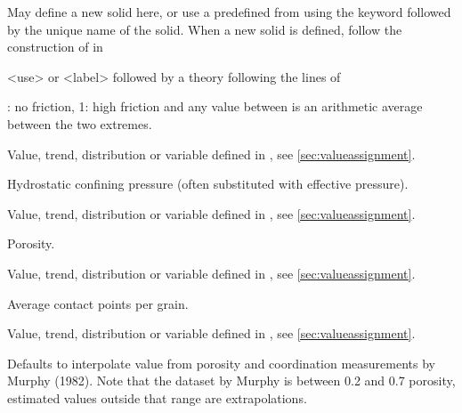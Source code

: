 {
 \slist
   \item \Description May define a new solid here, or use a predefined  from  using the keyword  followed by the unique name of the solid. When a new solid is defined, follow the construction of  in 
   \item \Argument <use> or <label> followed by a theory following the lines of 
   \item \Default
 \elist

 \slist
   \item {}: no friction, 1: high friction and any value between is an arithmetic average between the two extremes.
   \item \Argument Value, trend, distribution or variable defined in , see \autoref{sec:valueassignment}.
   \item \Default
 \elist

 \slist
   \item \Description Hydrostatic confining pressure (often substituted with effective pressure).
   \item \Argument Value, trend, distribution or variable defined in , see \autoref{sec:valueassignment}.
   \item \Default
 \elist

 \slist
   \item \Description Porosity.
   \item \Argument Value, trend, distribution or variable defined in , see \autoref{sec:valueassignment}.
   \item \Default
 \elist

 \slist
   \item \Description Average contact points per grain.
   \item \Argument Value, trend, distribution or variable defined in , see \autoref{sec:valueassignment}.
   \item \Default Defaults to interpolate value from porosity and coordination measurements by Murphy (1982). Note that the dataset by Murphy is between 0.2 and 0.7 porosity, estimated values outside that range are extrapolations.
 \elist

}
